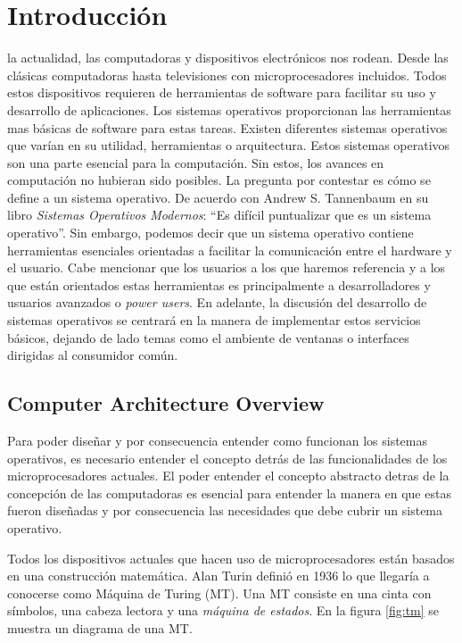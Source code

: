 \section{Introducción}

 la actualidad, las computadoras y dispositivos electrónicos nos
rodean. Desde las clásicas computadoras hasta televisiones con
microprocesadores incluidos. Todos estos dispositivos requieren de herramientas
de software para facilitar su uso y desarrollo de aplicaciones. Los sistemas
operativos proporcionan las herramientas mas básicas de software para estas
tareas. Existen diferentes sistemas operativos que varían en su utilidad,
herramientas o arquitectura. Estos sistemas operativos son una parte esencial
para la computación. Sin estos, los avances en computación no hubieran sido
posibles.  La pregunta por contestar es cómo se define a un sistema
operativo. De acuerdo con Andrew S. Tannenbaum en su libro \emph{Sistemas
Operativos Modernos}: ``Es difícil puntualizar que es un sistema
operativo''. Sin embargo, podemos decir que un sistema operativo contiene
herramientas esenciales orientadas a facilitar la comunicación entre el
hardware y el usuario. Cabe mencionar que los usuarios a los que haremos
referencia y a los que están orientados estas herramientas es principalmente a
desarrolladores y usuarios avanzados o \emph{power users}. En adelante, la
discusión del desarrollo de sistemas operativos se centrará en la manera de
implementar estos servicios básicos, dejando de lado temas como el ambiente de
ventanas o interfaces dirigidas al consumidor común.

\subsection{Computer Architecture Overview}

Para poder diseñar y por consecuencia entender como funcionan los sistemas
operativos, es necesario entender el concepto detrás de las funcionalidades de
los microprocesadores actuales. El poder entender el concepto abstracto detras
de la concepción de las computadoras es esencial para entender la manera en que
estas fueron diseñadas y por consecuencia las necesidades que debe cubrir un
sistema operativo.

Todos los dispositivos actuales que hacen uso de microprocesadores están
basados en una construcción matemática. Alan Turin definió en 1936 lo que
llegaría a conocerse como Máquina de Turing (MT).  Una MT consiste en una cinta
con símbolos, una cabeza lectora y una \emph{máquina de estados}. En la figura
\ref{fig:tm} se muestra un diagrama de una MT. 


